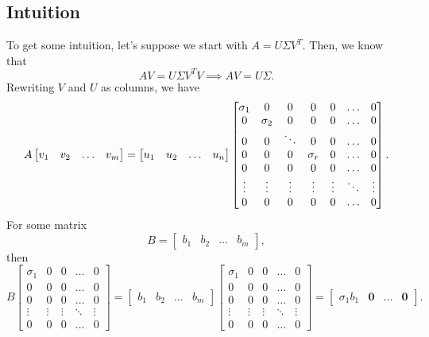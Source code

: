 \documentclass[letterpaper]{article}
\newcommand{\0}{\mathbf{0}}
\begin{document}
\subsection{Intuition}
To get some intuition, let's suppose we start with $A = U\Sigma V^T$. Then, we know that \[AV = U\Sigma V^T V \implies AV = U\Sigma.\] Rewriting $V$ and $U$ as columns, we have 
\begin{equation}{\label{lec15:1}}
    A\begin{bmatrix}
        v_1 & v_2 & \hdots & v_m
    \end{bmatrix} = \begin{bmatrix}
        u_1 & u_2 & \hdots & u_n
    \end{bmatrix} \begin{bmatrix}
        \sigma_1 & 0 & 0 & 0 & 0 & \hdots & 0 \\ 
        0 & \sigma_2 & 0 & 0 & 0 & \hdots & 0 \\ 
        0 & 0 & \ddots & 0 & 0 & \hdots & 0 \\ 
        0 & 0 & 0 & \sigma_r & 0 & \hdots & 0 \\ 
        0 & 0 & 0 & 0 & 0 & \hdots & 0 \\ 
        \vdots & \vdots & \vdots & \vdots & \vdots & \ddots & \vdots \\ 
        0 & 0 & 0 & 0 & 0 & \hdots & 0
    \end{bmatrix}.
\end{equation}
For some matrix 
\[B = \begin{bmatrix}
    b_1 & b_2 & \hdots & b_m
\end{bmatrix},\] then \[B \begin{bmatrix}
    \sigma_1 & 0 & 0 & \hdots & 0 \\ 
    0 & 0 & 0 & \hdots & 0 \\ 
    0 & 0 & 0 & \hdots & 0 \\ 
    \vdots & \vdots & \vdots & \ddots & \vdots \\
    0 & 0 & 0 & \hdots & 0
\end{bmatrix} = \begin{bmatrix}
    b_1 & b_2 & \hdots & b_m
\end{bmatrix}\begin{bmatrix}
    \sigma_1 & 0 & 0 & \hdots & 0 \\ 
    0 & 0 & 0 & \hdots & 0 \\ 
    0 & 0 & 0 & \hdots & 0 \\ 
    \vdots & \vdots & \vdots & \ddots & \vdots \\
    0 & 0 & 0 & \hdots & 0
\end{bmatrix} = \begin{bmatrix}
    \sigma_1 b_1 & \0 & \hdots & \0
\end{bmatrix}.\]
\end{document}
